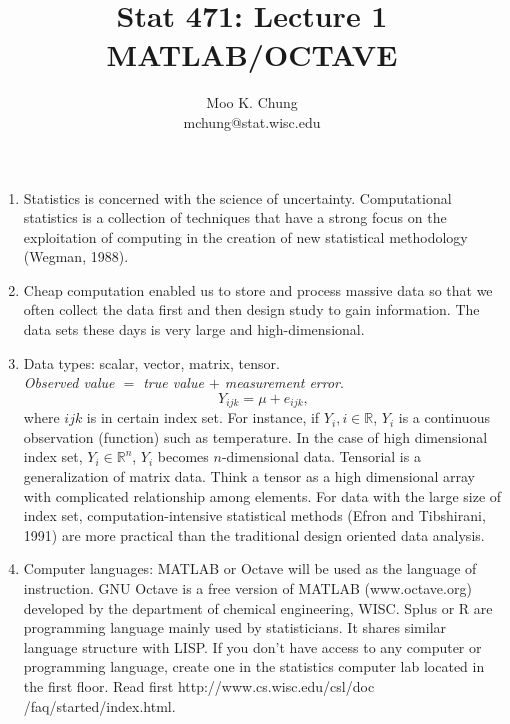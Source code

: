 \documentclass[11pt,twocolumn]{article} %
\begin{document}
\title{Stat 471: Lecture 1\\
MATLAB/OCTAVE}
\author{Moo K. Chung\\
mchung@stat.wisc.edu}
\maketitle \thispagestyle{empty}
\begin{enumerate}
\item Statistics is concerned with the science of uncertainty.
Computational statistics is a collection of techniques that have a
strong focus on the exploitation of computing in the creation of
new statistical methodology (Wegman, 1988).

\item Cheap computation enabled us to store and process massive
data so that we often collect the data first and then design study
to gain information. The data sets these days is very large and
high-dimensional.

\item Data types: scalar, vector, matrix, tensor.\\
{\em Observed value $=$ true value $+$ measurement error}.
$$Y_{ijk} = \mu + e_{ijk},$$
where $ijk$ is in certain index set. For instance, if $Y_i, i \in
\mathbb{R}$, $Y_i$ is a continuous observation (function) such as
temperature. In the case of high dimensional index set, $Y_i \in
\mathbb{R}^n$, $Y_i$ becomes $n$-dimensional data. Tensorial is a
generalization of matrix data. Think a tensor as a high
dimensional array with complicated relationship among elements.
For data with the large size of index set, computation-intensive
statistical methods (Efron and Tibshirani, 1991) are more
practical than the traditional design oriented data analysis.

\item Computer languages: MATLAB or Octave will be used as the
language of instruction. GNU Octave is a free version of MATLAB
(www.octave.org) developed by the department of chemical
engineering, WISC. Splus or R are programming language mainly used
by statisticians. It shares similar language structure with LISP.
If you don't have access to any computer or programming language,
create one in the statistics computer lab located in the first
floor. Read first http://www.cs.wisc.edu/csl/doc\\
/faq/started/index.html.


\end{enumerate}
\end{document}
